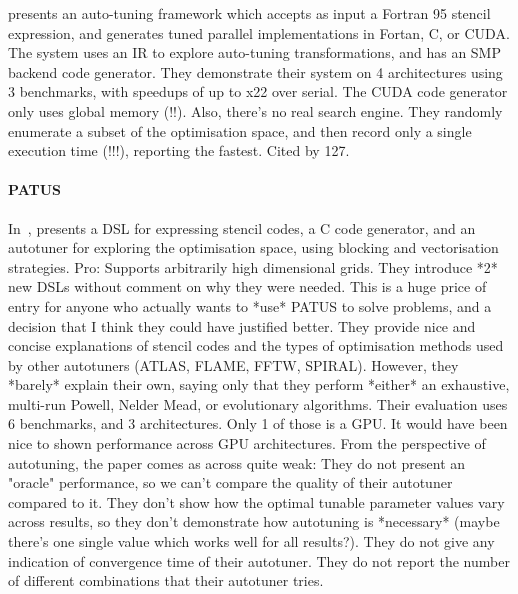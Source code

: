 \citeauthor{Kamil2010} presents an auto-tuning framework which accepts as input a
Fortran 95 stencil expression, and generates tuned parallel
implementations in Fortan, C, or CUDA. The system uses an IR to
explore auto-tuning transformations, and has an SMP backend code
generator. They demonstrate their system on 4 architectures using 3
benchmarks, with speedups of up to x22 over serial. The CUDA code
generator only uses global memory (!!). Also, there's no real search
engine. They randomly enumerate a subset of the optimisation space,
and then record only a single execution time (!!!), reporting the
fastest. Cited by 127.~\cite{Kamil2010}

\paragraph{PATUS} In~\cite{Christen2011}, \citeauthor{Christen2011}
presents a DSL for expressing stencil codes, a C code generator, and
an autotuner for exploring the optimisation space, using blocking and
vectorisation strategies. Pro: Supports arbitrarily high dimensional
grids. They introduce *2* new DSLs without comment on why they were
needed. This is a huge price of entry for anyone who actually wants to
*use* PATUS to solve problems, and a decision that I think they could
have justified better. They provide nice and concise explanations of
stencil codes and the types of optimisation methods used by other
autotuners (ATLAS, FLAME, FFTW, SPIRAL). However, they *barely*
explain their own, saying only that they perform *either* an
exhaustive, multi-run Powell, Nelder Mead, or evolutionary algorithms.
Their evaluation uses 6 benchmarks, and 3 architectures. Only 1 of
those is a GPU. It would have been nice to shown performance across
GPU architectures. From the perspective of autotuning, the paper comes
as across quite weak: They do not present an "oracle" performance, so
we can't compare the quality of their autotuner compared to it. They
don't show how the optimal tunable parameter values vary across
results, so they don't demonstrate how autotuning is *necessary*
(maybe there's one single value which works well for all
results?). They do not give any indication of convergence time of
their autotuner. They do not report the number of different
combinations that their autotuner tries.

